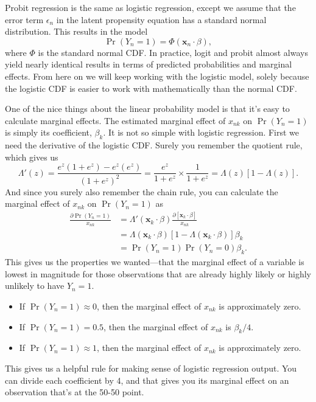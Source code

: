 \documentclass[12pt,oneside,openany]{book}
\begin{document}
Probit regression is the same as logistic regression, except we assume
that the error term \(\epsilon_n\) in the latent propensity equation has
a standard normal distribution. This results in the model \[
\Pr(Y_n = 1) = \Phi(\mathbf{x}_n \cdot \beta),
\] where \(\Phi\) is the standard normal CDF. In practice, logit and
probit almost always yield nearly identical results in terms of
predicted probabilities and marginal effects. From here on we will keep
working with the logistic model, solely because the logistic CDF is
easier to work with mathematically than the normal CDF.

One of the nice things about the linear probability model is that it's
easy to calculate marginal effects. The estimated marginal effect of
\(x_{nk}\) on \(\Pr(Y_n = 1)\) is simply its coefficient, \(\beta_k\).
It is not so simple with logistic regression. First we need the
derivative of the logistic CDF. Surely you remember the quotient rule,
which gives us \[
\Lambda'(z)
= \frac{e^z (1 + e^z) - e^z (e^z)}{(1 + e^z)^2}
= \frac{e^z}{1 + e^z} \times \frac{1}{1 + e^z}
= \Lambda(z) [1 - \Lambda(z)].
\] And since you surely also remember the chain rule, you can calculate
the marginal effect of \(x_{nk}\) on \(\Pr(Y_n = 1)\) as \[
\begin{aligned}
\frac{\partial \Pr(Y_n = 1)}{x_{nk}}
&= \Lambda'(\mathbf{x}_k \cdot \beta) \frac{\partial [\mathbf{x}_k \cdot \beta]}{x_{nk}} \\
&= \Lambda(\mathbf{x}_k \cdot \beta) [1 - \Lambda(\mathbf{x}_k \cdot \beta)] \beta_k \\
&= \Pr(Y_n = 1) \Pr(Y_n = 0) \beta_k.
\end{aligned}
\] This gives us the properties we wanted---that the marginal effect of
a variable is lowest in magnitude for those observations that are
already highly likely or highly unlikely to have \(Y_n = 1\).

\begin{itemize}
\item
  If \(\Pr(Y_n = 1) \approx 0\), then the marginal effect of \(x_{nk}\)
  is approximately zero.
\item
  If \(\Pr(Y_n = 1) = 0.5\), then the marginal effect of \(x_{nk}\) is
  \(\beta_k / 4\).
\item
  If \(\Pr(Y_n = 1) \approx 1\), then the marginal effect of \(x_{nk}\)
  is approximately zero.
\end{itemize}

This gives us a helpful rule for making sense of logistic regression
output. You can divide each coefficient by 4, and that gives you its
marginal effect on an observation that's at the 50-50 point.
\end{document}
